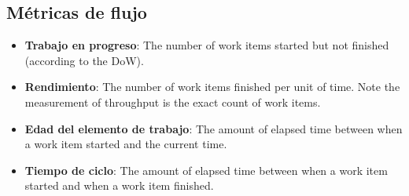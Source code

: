 \subsection{Métricas de flujo}

\begin{itemize}
    \item \textbf{Trabajo en progreso}: The number of work items started but not finished
    (according to the DoW).
    \item \textbf{Rendimiento}: The number of work items finished per unit of
    time. Note the measurement of throughput is the exact count of work items.
    \item \textbf{Edad del elemento de trabajo}: The amount of elapsed time between when a work
    item started and the current time.
    \item \textbf{Tiempo de ciclo}: The amount of elapsed time between when a work
    item started and when a work item finished.
\end{itemize}

